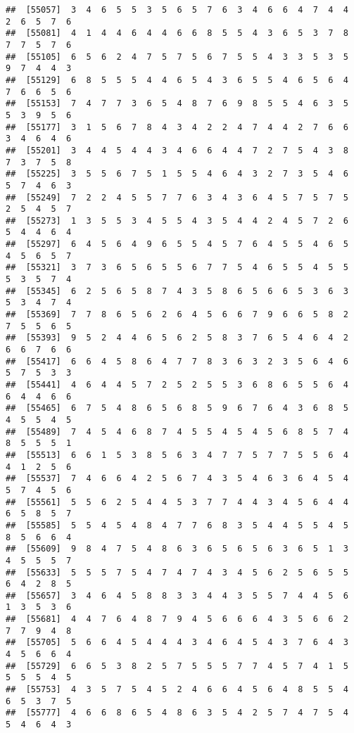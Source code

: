 \documentclass[
]{book}
\begin{document}
\begin{verbatim}
##  [55057]  3  4  6  5  5  3  5  6  5  7  6  3  4  6  6  4  7  4  4  2  6  5  7  6
##  [55081]  4  1  4  4  6  4  4  6  6  8  5  5  4  3  6  5  3  7  8  7  7  5  7  6
##  [55105]  6  5  6  2  4  7  5  7  5  6  7  5  5  4  3  3  5  3  5  9  7  4  4  3
##  [55129]  6  8  5  5  5  4  4  6  5  4  3  6  5  5  4  6  5  6  4  7  6  6  5  6
##  [55153]  7  4  7  7  3  6  5  4  8  7  6  9  8  5  5  4  6  3  5  5  3  9  5  6
##  [55177]  3  1  5  6  7  8  4  3  4  2  2  4  7  4  4  2  7  6  6  3  4  6  4  6
##  [55201]  3  4  4  5  4  4  3  4  6  6  4  4  7  2  7  5  4  3  8  7  3  7  5  8
##  [55225]  3  5  5  6  7  5  1  5  5  4  6  4  3  2  7  3  5  4  6  5  7  4  6  3
##  [55249]  7  2  2  4  5  5  7  7  6  3  4  3  6  4  5  7  5  7  5  2  5  4  5  7
##  [55273]  1  3  5  5  3  4  5  5  4  3  5  4  4  2  4  5  7  2  6  5  4  4  6  4
##  [55297]  6  4  5  6  4  9  6  5  5  4  5  7  6  4  5  5  4  6  5  4  5  6  5  7
##  [55321]  3  7  3  6  5  6  5  5  6  7  7  5  4  6  5  5  4  5  5  5  3  5  7  4
##  [55345]  6  2  5  6  5  8  7  4  3  5  8  6  5  6  6  5  3  6  3  5  3  4  7  4
##  [55369]  7  7  8  6  5  6  2  6  4  5  6  6  7  9  6  6  5  8  2  7  5  5  6  5
##  [55393]  9  5  2  4  4  6  5  6  2  5  8  3  7  6  5  4  6  4  2  6  6  7  6  6
##  [55417]  6  6  4  5  8  6  4  7  7  8  3  6  3  2  3  5  6  4  6  5  7  5  3  3
##  [55441]  4  6  4  4  5  7  2  5  2  5  5  3  6  8  6  5  5  6  4  6  4  4  6  6
##  [55465]  6  7  5  4  8  6  5  6  8  5  9  6  7  6  4  3  6  8  5  4  5  5  4  5
##  [55489]  7  4  5  4  6  8  7  4  5  5  4  5  4  5  6  8  5  7  4  8  5  5  5  1
##  [55513]  6  6  1  5  3  8  5  6  3  4  7  7  5  7  7  5  5  6  4  4  1  2  5  6
##  [55537]  7  4  6  6  4  2  5  6  7  4  3  5  4  6  3  6  4  5  4  5  7  4  5  6
##  [55561]  5  5  6  2  5  4  4  5  3  7  7  4  4  3  4  5  6  4  4  6  5  8  5  7
##  [55585]  5  5  4  5  4  8  4  7  7  6  8  3  5  4  4  5  5  4  5  8  5  6  6  4
##  [55609]  9  8  4  7  5  4  8  6  3  6  5  6  5  6  3  6  5  1  3  4  5  5  5  7
##  [55633]  5  5  5  7  5  4  7  4  7  4  3  4  5  6  2  5  6  5  5  6  4  2  8  5
##  [55657]  3  4  6  4  5  8  8  3  3  4  4  3  5  5  7  4  4  5  6  1  3  5  3  6
##  [55681]  4  4  7  6  4  8  7  9  4  5  6  6  6  4  3  5  6  6  2  7  7  9  4  8
##  [55705]  5  6  6  4  5  4  4  4  3  4  6  4  5  4  3  7  6  4  3  4  5  6  6  4
##  [55729]  6  6  5  3  8  2  5  7  5  5  5  7  7  4  5  7  4  1  5  5  5  5  4  5
##  [55753]  4  3  5  7  5  4  5  2  4  6  6  4  5  6  4  8  5  5  4  6  5  3  7  5
##  [55777]  4  6  6  8  6  5  4  8  6  3  5  4  2  5  7  4  7  5  4  5  4  6  4  3

\end{verbatim}
\end{document}
